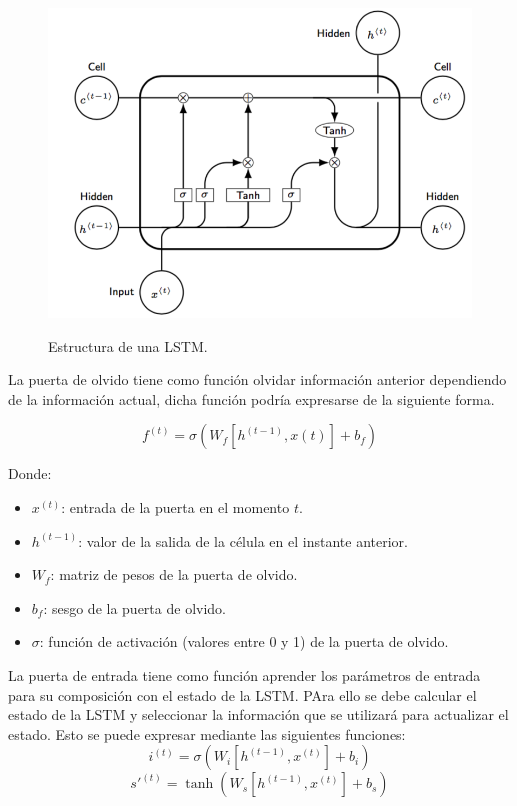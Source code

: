 \begin{figure}[h]
	\centering
	\includegraphics[width=120mm]{imagenes/lstm-struct.png}
	\label{fig:22}
	\caption{Estructura de una LSTM.}
\end{figure}
\vspace{0.09in}
La puerta de olvido tiene como función olvidar información anterior dependiendo de la información actual, dicha función podría expresarse de la siguiente forma.

$$ f^{(t)} = \sigma( W_f[h^{(t-1)}, x(t)] + b_f) $$

Donde:
\begin{itemize}
	\item $x^{(t)}$: entrada de la puerta en el momento $t$.
	\item $h^{(t-1)} $: valor de la salida de la célula en el instante anterior.
	\item $W_f $: matriz de pesos de la puerta de olvido.
	\item $b_f $: sesgo de la puerta de olvido.
	\item $\sigma$: función de activación (valores entre 0 y 1) de la puerta de olvido.
\end{itemize}
\vspace{0.09in}
La puerta de entrada tiene como función aprender los parámetros de entrada para su composición con el estado de la LSTM. PAra ello se debe calcular el estado de la LSTM y seleccionar la información que se utilizará para actualizar el estado. Esto se puede expresar mediante las siguientes funciones:\newline
$$ i^{(t)} = \sigma(W_i[h^{(t-1)}, x^{(t)}] + b_i) $$
$$ s'^{(t)} = \tanh(W_s[h^(t-1), x^{(t)}] + b_s) $$

